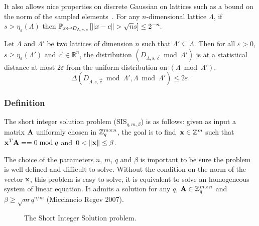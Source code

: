 It also allows nice properties on discrete Gaussian on lattices such as a bound on the norm of the sampled elements~\cite{MR04}.
For any $n$-dimensional lattice $\Lambda$, if $s > \eta_{\varepsilon}(\Lambda)$ then
$\mathbb{P}_{x \hookleftarrow D_{\Lambda,s,c}} \left[\Vert x-c \Vert > \sqrt{n} s \right] \leq 2^{-n}.$

\begin{lemma}
Let $\Lambda$ and $\Lambda'$ be two lattices of dimension $n$ such that $\Lambda' \subseteq \Lambda$. Then for all $\varepsilon >0$, $s \geq \eta_{\varepsilon}(\Lambda')$ and $\vec{c} \in \mathbb{R}^n$, the distribution $(D_{\Lambda,s,\vec{c}} \bmod \Lambda')$ is at a statistical distance at most $2 \varepsilon$ from the uniform distribution on $(\Lambda \bmod \Lambda')$.
$$ \Delta(D_{\Lambda,s,\vec{c}} \bmod \Lambda', \Lambda \bmod \Lambda') \leq 2 \varepsilon.$$
\end{lemma}

\subsubsection{Definition}

\begin{definition}
\label{def:SIS}
The short integer solution problem (SIS$_{q,m,\beta}$) is as follows: given as input a matrix $\bf A$ uniformly chosen in $\mathbb{Z}_q^{m \times n}$, the goal is to find~${\bf x} \in \mathbb{Z}^{m}$ such that ${\bf x}^T {\bf A} =  = 0 \bmod q$ and~$0 < \|{\bf x}\| \leq \beta $. 
\end{definition}

The choice of the parameters $n$, $m$, $q$ and $\beta$ is important to be sure the problem is well defined and difficult to solve. Without the condition on the norm of the vector $\bf x$, this problem is easy to solve, it is equivalent to solve an homogeneous system of linear equation.
It admits a solution for any $q$, ${\bf A} \in \mathbb{Z}_q^{m \times n}$ and $\beta \geq \sqrt{m} q^{n/m}$ (Micciancio Regev 2007).

\begin{figure}[h]
\begin{center}


\caption{The Short Integer Solution problem.}\label{fig:SIS}
\end{center}
\end{figure}

